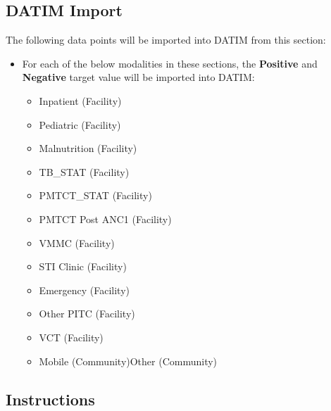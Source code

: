 \documentclass[
  openany]{book}
\begin{document}
\hypertarget{datim-import-27}{%
\subsection{DATIM Import}\label{datim-import-27}}

The following data points will be imported into DATIM from this section:

\begin{itemize}
\item
  For each of the below modalities in these sections, the \textbf{Positive}
  and \textbf{Negative} target value will be imported into DATIM:

  \begin{itemize}
  \item
    Inpatient (Facility)
  \item
    Pediatric (Facility)
  \item
    Malnutrition (Facility)
  \item
    TB\_STAT (Facility)
  \item
    PMTCT\_STAT (Facility)
  \item
    PMTCT Post ANC1 (Facility)
  \item
    VMMC (Facility)
  \item
    STI Clinic (Facility)
  \item
    Emergency (Facility)
  \item
    Other PITC (Facility)
  \item
    VCT (Facility)
  \item
    Mobile (Community)Other (Community)
  \end{itemize}
\end{itemize}

\hypertarget{instructions-27}{%
\subsection{Instructions}\label{instructions-27}}
\end{document}
